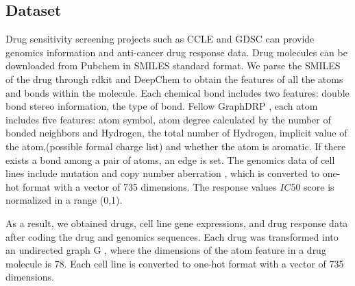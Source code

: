 \documentclass{article}
\begin{document}
\subsection{Dataset}


Drug sensitivity screening projects such as CCLE \cite{CCLE}
 and GDSC \cite{GDSC} can provide genomics information and anti-cancer drug response data.
Drug molecules can be downloaded from Pubchem in SMILES standard format.
We parse the SMILES of the drug through rdkit and DeepChem to obtain the features of all the atoms and bonds within the molecule. Each chemical bond includes two features: double bond stereo information, the type of bond.
Fellow GraphDRP \cite{110bGCNforDRP}, each atom includes five features: atom symbol, atom degree calculated by the number of bonded neighbors and Hydrogen, the total number of Hydrogen, implicit value of the atom,(possible formal charge list) and whether the atom is aromatic.
If there exists a bond among a pair of atoms, an edge is set.
The genomics data of cell lines include mutation and copy number aberration , which is converted to one-hot format with a vector of 735 dimensions.
The response values $IC50$ score is normalized in a range (0,1).



As a result, we obtained  drugs,  cell line gene expressions, and  drug response data after coding the drug and genomics sequences. Each drug was transformed into an undirected graph G , where the dimensions of the atom feature in a drug molecule is 78. Each cell line is converted to one-hot format with a vector of 735 dimensions.
\end{document}
